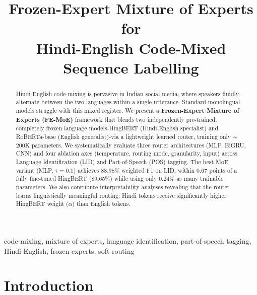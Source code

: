 \documentclass[conference]{IEEEtran}
\begin{document}
\title{Frozen-Expert Mixture of Experts for\\Hindi-English Code-Mixed Sequence Labelling}

\author{
}


\maketitle

\begin{abstract}
Hindi-English code-mixing is pervasive in Indian social media, where speakers fluidly alternate between the two languages within a single utterance. Standard monolingual models struggle with this mixed register. We present a \textbf{Frozen-Expert Mixture of Experts (FE-MoE)} framework that blends two independently pre-trained, completely frozen language models-HingBERT (Hindi-English specialist) and RoBERTa-base (English generalist)-via a lightweight learned router, training only $\sim$200K parameters. We systematically evaluate three router architectures (MLP, BiGRU, CNN) and four ablation axes (temperature, routing mode, granularity, input) across Language Identification (LID) and Part-of-Speech (POS) tagging. The best MoE variant (MLP, $\tau{=}0.1$) achieves 88.98\% weighted F1 on LID, within 0.67 points of a fully fine-tuned HingBERT (89.65\%) while using only 0.24\% as many trainable parameters. We also contribute interpretability analyses revealing that the router learns linguistically meaningful routing: Hindi tokens receive significantly higher HingBERT weight ($\alpha$) than English tokens.
\end{abstract}

\begin{IEEEkeywords}
code-mixing, mixture of experts, language identification, part-of-speech tagging, Hindi-English, frozen experts, soft routing
\end{IEEEkeywords}

\section{Introduction}
\end{document}
